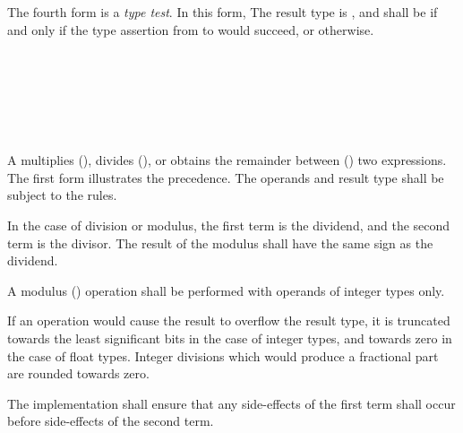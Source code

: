 \specsubsubitem The fourth form is a \textit{type test}. In this form, The
result type is , and shall be  if and only if the
type assertion from  to
 would succeed, or  otherwise.


\begin{grammar}
 \\
	 \\
	 \terminal{*}  \\
	 \terminal{/}  \\
	 \terminal{\%}  \\
\end{grammar}

\specsubsubitem
A  multiplies (\terminal{*}), divides
(\terminal{/}), or obtains the remainder between (\terminal{\%}) two
expressions. The first form illustrates the precedence. The operands and result
type shall be subject to the  rules.

\specsubsubitem
In the case of division or modulus, the first term is the dividend, and the
second term is the divisor. The result of the modulus shall have the same sign
as the dividend.

\specsubsubitem
A modulus (\terminal{\%}) operation shall be performed with operands of integer
types only.

\specsubsubitem
If an operation would cause the result to overflow the result type, it is
truncated towards the least significant bits in the case of integer types, and
towards zero in the case of float types. Integer divisions which would produce
a fractional part are rounded towards zero.

\specsubsubitem
The implementation shall ensure that any side-effects of the first term shall
occur before side-effects of the second term.


\begin{grammar}
 \\
	 \\
	 \terminal{+}  \\
	 \terminal{-}  \\
\end{grammar}

